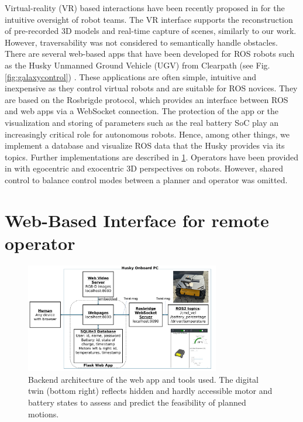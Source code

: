 \documentclass[letterpaper, 10 pt, conference]{ieeeconf}  %
\begin{document}
Virtual-reality (VR) based interactions have been recently proposed in \cite{huang2024evaluation} for the intuitive oversight of robot teams. The VR interface supports the reconstruction of pre-recorded 3D models and real-time capture of scenes, similarly to our work. However,  traversability was not considered to semantically handle obstacles. There are several web-based apps that have been developed for ROS robots such as the Husky Unmanned Ground Vehicle (UGV) from Clearpath (see Fig.\ref{fig:galaxycontrol}) \cite{husky}. These applications are often simple, intuitive and inexpensive as they control virtual robots and are suitable for ROS novices.
They are based on the Rosbrigde protocol, which provides an interface between ROS and web apps via a WebSocket connection\cite{kapic,dinodi,rosbridgeOkState,rosbridgeSuite}.
The protection of the app or the visualization and storing of parameters such as the real battery SoC play an increasingly critical role for autonomous robots.
Hence, among other things, we implement a database and visualize ROS data that the Husky provides via its topics.  Further implementations are described in \ref{sec:framework}.
Operators have been provided in \cite{walker2024cyber} with egocentric and exocentric 3D perspectives on robots. However, shared control to balance control modes between a planner and operator was omitted. 





\section{Web-Based Interface for remote operator}
\label{sec:framework}

\begin{figure}[b]
	\centerline{\includegraphics[width=8.5cm]{images/ROS_Web_App_Architecture.pdf}}
	\caption{Backend architecture of the web app and tools used. The digital twin (bottom right) reflects hidden and hardly accessible motor and battery states to assess and predict the feasibility of planned motions.}
	\label{fig:userapp}
\end{figure}
\end{document}
